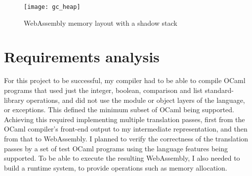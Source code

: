 



\hspace{-0.18cm}
\begin{figure}[H]
\texttt{[image: gc\_heap]}
\caption{WebAssembly memory layout with a shadow stack}
\label{fig:wasm-shadow}
\end{figure}





\section{Requirements analysis}
For this project to be successful, my compiler had to be able to compile OCaml programs that used just the integer, boolean, comparison and list standard-library operations, and did not use the module or object layers of the language, or exceptions. This defined the minimum subset of OCaml being supported. Achieving this required implementing multiple translation passes, first from the OCaml compiler's front-end output to my intermediate representation, and then from that to WebAssembly. I planned to verify the correctness of the translation passes by a set of test OCaml programs using the language features being supported. To be able to execute the resulting WebAssembly, I also needed to build a runtime system, to provide operations such as memory allocation. 

